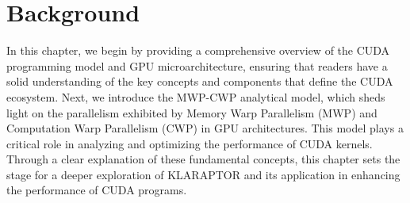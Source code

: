 \chapter{Background}
\label{ch:background}

In this chapter, we begin by providing a comprehensive overview of the CUDA programming model and GPU microarchitecture, 
ensuring that readers have a solid understanding of the key concepts and components that define the CUDA 
ecosystem. Next, we introduce the MWP-CWP analytical model, which sheds light on the parallelism exhibited 
by Memory Warp Parallelism (MWP) and Computation Warp Parallelism (CWP) in GPU architectures. This model 
plays a critical role in analyzing and optimizing the performance of CUDA kernels. Through a clear explanation 
of these fundamental concepts, this chapter sets the stage for a deeper exploration of KLARAPTOR and its application 
in enhancing the performance of CUDA programs.







